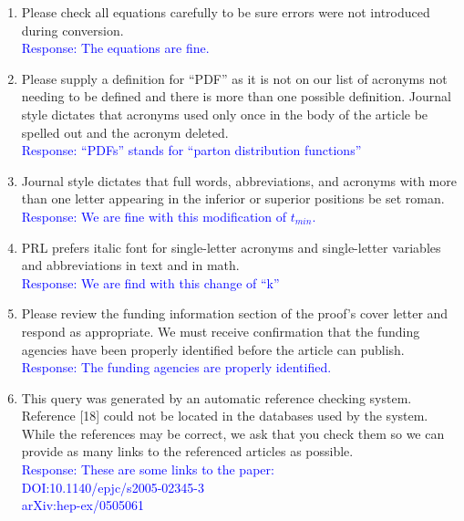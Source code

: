 \documentclass[a4paper,11pt,twoside]{article}
\begin{document}
\begin{enumerate}
      \item Please check all equations carefully to be sure errors were not 
         introduced during conversion.\\
      \textcolor{blue}{Response: The equations are fine.}

      \item Please supply a definition for ``PDF'' as it is not on our list of 
         acronyms not needing to be defined and there is more than one possible 
         definition. Journal style dictates that acronyms used only once in the 
         body of the article be spelled out and the acronym deleted.\\
      \textcolor{blue}{Response: ``PDFs'' stands for ``parton distribution 
      functions'' }
         
         
\item Journal style dictates that full words, abbreviations, and acronyms with 
   more than one letter appearing in the inferior or superior positions be set 
      roman.\\
      \textcolor{blue}{Response: We are fine with this modification of 
      $t_{min}$.}

\item PRL prefers italic font for single-letter acronyms and single-letter 
   variables and abbreviations in text and in math.\\
      \textcolor{blue}{Response: We are find with this change of ``k'' }

\item Please review the funding information section of the proof's cover letter 
   and respond as appropriate. We must receive confirmation that the funding 
      agencies have been properly identified before the article can publish.\\
      \textcolor{blue}{Response: The funding agencies are properly identified.  
      }

\item This query was generated by an automatic reference checking system.  
   Reference [18] could not be located in the databases used by the system.  
      While the references may be correct, we ask that you check them so we can 
      provide as many links to the referenced articles as possible.\\  
      \textcolor{blue}{Response: These are some links to the paper:\\
     DOI:10.1140/epjc/s2005-02345-3\\        arXiv:hep-ex/0505061}


\end{enumerate}
\end{document}
